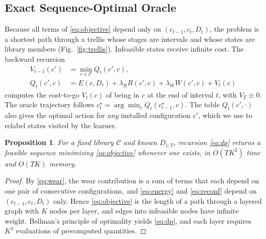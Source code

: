 \documentclass[5p,times]{elsarticle}
\newtheorem{proposition}{Proposition}
\begin{document}
\subsection{Exact Sequence-Optimal Oracle}

Because all terms of \eqref{eq:objective} depend only on $(c_{t-1},c_t,D_t)$, the problem is a shortest path through a trellis whose stages are intervals and whose states are library members (Fig.~\ref{fig:trellis}). Infeasible states receive infinite cost. The backward recursion
\begin{equation}\label{eq:dp}
\begin{aligned}V_{t-1}(c')&=\min_{c\in\mathcal{C}}Q_t(c',c),\\
Q_t(c',c)&=E(c,D_t)+\lambda_R R(c',c)+\lambda_W W(c',c)+V_t(c)\end{aligned}
\end{equation}
computes the cost-to-go $V_t(c)$ of being in $c$ at the end of interval $t$, with $V_T\equiv0$. The oracle trajectory follows $c^\star_t=\arg\min_c Q_t(c^\star_{t-1},c)$. The table $Q_t(c',\cdot)$ also gives the optimal action for \emph{any} installed configuration $c'$, which we use to relabel states visited by the learner.

\begin{proposition}\label{prop:dp}
For a fixed library $\mathcal{C}$ and known $D_{1:T}$, recursion \eqref{eq:dp} returns a feasible sequence minimizing \eqref{eq:objective} whenever one exists, in $O(TK^2)$ time and $O(TK)$ memory.
\end{proposition}
\begin{proof}
By \eqref{eq:wear}, the wear contribution is a sum of terms that each depend on one pair of consecutive configurations, and \eqref{eq:energy} and \eqref{eq:reconf} depend on $(c_{t-1},c_t,D_t)$ only. Hence \eqref{eq:objective} is the length of a path through a layered graph with $K$ nodes per layer, and edges into infeasible nodes have infinite weight. Bellman's principle of optimality yields \eqref{eq:dp}, and each layer requires $K^2$ evaluations of precomputed quantities.
\end{proof}
\end{document}
